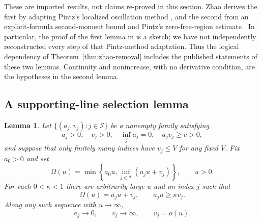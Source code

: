 \documentclass[11pt,a4paper]{article}
\numberwithin{equation}{section}
\newtheorem{lemma}[theorem]{Lemma}
\theoremstyle{definition}\newtheorem{definition}[theorem]{Definition}
\theoremstyle{remark}\newtheorem{remark}[theorem]{Remark}
\begin{document}
These are imported results, not claims re-proved in this section.
Zhao derives the first by adapting Pintz's localized oscillation method
\cite{Pintz1980I}, and the second from an explicit-formula second-moment
bound and Pintz's zero-free-region estimate \cite{Pintz1980II}.
In particular, the proof of the first lemma in \cite{Zhao2025} is a
sketch; we have not independently reconstructed every step of that
Pintz-method adaptation. Thus the logical dependency of
Theorem~\ref{thm:zhao-removal} includes the published statements of
these two lemmas. Continuity and nonincrease, with no derivative
condition, are the hypotheses in the second lemma.

\subsection{A supporting-line selection lemma}

\begin{lemma}
\label{lem:zhao-selection}
Let $\{(a_j,v_j):j\in\mathcal I\}$ be a nonempty family satisfying
\[
 a_j>0,\quad v_j>0,\quad
 \inf_j a_j=0,\quad a_jv_j\geq c>0,
\]
and suppose that only finitely many indices have $v_j\leq V$ for
any fixed $V$. Fix $a_0>0$ and set
\[
 \Omega(u)=\min\left\{a_0u,\inf_{j\in\mathcal I}(a_ju+v_j)\right\},
 \qquad u>0.
\]
For each $0<\kappa<1$ there are arbitrarily large $u$ and an index
$j$ such that
\begin{equation}
 \label{eq:zhao-selected-zero}
 \Omega(u)=a_ju+v_j,\qquad a_ju\geq\kappa v_j.
\end{equation}
Along any such sequence with $u\to\infty$,
\[
 a_j\to0,\qquad v_j\to\infty,\qquad v_j=o(u).
\]
\end{lemma}
\end{document}
